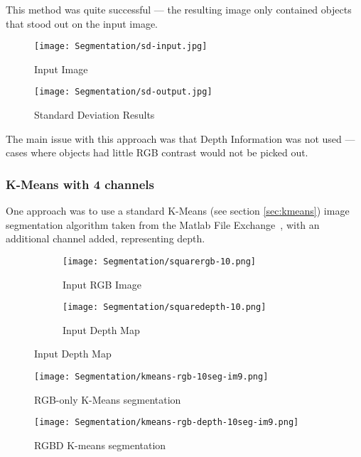 This method was quite successful --- the resulting image only contained objects that stood out on the input image.

\begin{figure}[H]
    \centering
    \texttt{[image: Segmentation/sd-input.jpg]}
    \caption{Input Image}
\end{figure}

\begin{figure}[H]
   \centering
   \texttt{[image: Segmentation/sd-output.jpg]}
   \caption{Standard Deviation Results}

\end{figure}

The main issue with this approach was that Depth Information was not used --- cases where objects had little RGB contrast would not be picked out. 

\subsubsection{K-Means with 4 channels}
One approach was to use a standard K-Means (see section \ref{sec:kmeans}) image segmentation algorithm taken from the Matlab File Exchange~\cite{kmeans-matlab}, with an additional channel added, representing depth. 

\begin{figure}[H]
    \centering
    \begin{subfigure}[b]{0.45\textwidth}
        \centering
        \texttt{[image: Segmentation/squarergb-10.png]}
        \caption{Input RGB Image}
    \end{subfigure}
    \hfill
    \begin{subfigure}[b]{0.45\textwidth}
        \centering
        \texttt{[image: Segmentation/squaredepth-10.png]}
        \caption{Input Depth Map}
    \end{subfigure}
\end{figure}

\begin{figure}[H]
    \centering
    \texttt{[image: Segmentation/kmeans-rgb-10seg-im9.png]}
    \caption{RGB-only K-Means segmentation}
\end{figure}

\begin{figure}[H]
    \centering
    \texttt{[image: Segmentation/kmeans-rgb-depth-10seg-im9.png]}
    \caption{RGBD K-means segmentation}
\end{figure}

